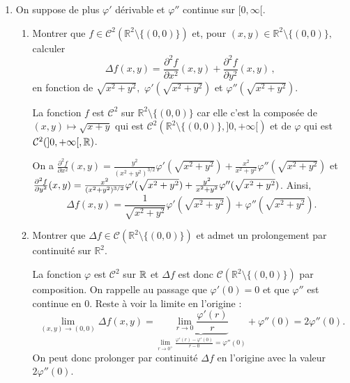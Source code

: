 \documentclass[a4paper]{tp_um}
\begin{document}
\begin{enumerate}
\item On suppose de plus $\varphi'$ d\'erivable et $\varphi''$ continue sur $[0,\infty[.$
\begin{enumerate}
\item Montrer que $f \in \mathcal C^2(\mathbb R^2 \setminus \{(0,0)\})$ et, pour $(x,y) \in \mathbb R^2 \setminus \{(0,0)\},$ 
calculer 
\[
\Delta f(x,y) = \dfrac{\partial^2 f}{\partial x^2} (x,y) + \dfrac{\partial^2 f}{\partial y^2} (x,y) \,, \
\]
en fonction de $\sqrt{x^2+y^2},$ $\varphi'(\sqrt{x^2+y^2})$ et $\varphi''(\sqrt{x^2+y^2}).$

\medskip

La fonction $f$ est $\mathcal C^2$ sur $\mathbb R^2 \setminus \{(0,0)\}$ car elle c'est la composée de $(x,y) \mapsto \sqrt{x+y}$ qui est $\mathcal C^2(\mathbb R^2 \setminus \{(0,0)\}, ]0,+\infty[)$  et de  $\varphi$ qui est $\mathcal C^2(]0,+\infty[, \mathbb{R})$. 

On a $\frac{\partial^2 f}{\partial x^2} (x,y) = \frac{y^2}{ (x^2+y^2)^{3/2}}  \varphi'(\sqrt{x^2+y^2}) +\frac{x^2}{{x^2+y^2}} \varphi''(\sqrt{x^2 + y^2}) $ et 
$\frac{\partial^2 f}{\partial y^2} (x,y) = \frac{x^2}{ (x^2+y^2)^{3/2}} \linebreak[4] \varphi'(\sqrt{x^2+y^2}) +\frac{y^2}{{x^2+y^2}} \varphi''(\sqrt{x^2 + y^2}) $. Ainsi,
\[
    \Delta f(x,y) = \frac{1}{\sqrt{x^2 + y^2} }\varphi'( \sqrt{x^2 + y^2}) + \varphi''( \sqrt{x^2 + y^2}).
\]

\medskip

\item Montrer que $\Delta f \in \mathcal C(\mathbb R^2 \setminus \{(0,0)\})$  et admet un prolongement
par continuit\'e sur $\mathbb R^2.$

\medskip

La fonction $\varphi$ est $\mathcal C^2$ sur $\mathbb{R}$ et $\Delta f$ est donc $\mathcal C(\mathbb R^2 \setminus \{(0,0)\}) $ par composition. On rappelle au passage que $\varphi'(0) = 0$ et que $\varphi''$ est continue en 0. Reste à voir la limite en l'origine :
\[
    \lim_{(x,y) \to (0,0) }  \Delta f(x,y)  =  \underbrace{\lim_{r \to 0 } \frac{\varphi'(r)}{r}}_{\lim_{r \to 0^+ }\limits \frac{\varphi'(r) - \varphi'(0)}{r - 0} = \varphi''(0)} + \varphi''(0) = 2 \varphi''(0). 
\]
On peut donc prolonger par continuité $\Delta f$ en l'origine avec la valeur $2\varphi''(0)$. 

\end{enumerate}

\end{enumerate}
\end{document}
